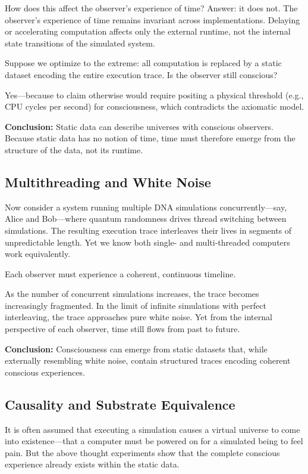 \documentclass[11pt]{article}
\begin{document}
How does this affect the observer's experience of time? Answer: it does not. The observer’s experience of time remains invariant across implementations. Delaying or accelerating computation affects only the external runtime, not the internal state transitions of the simulated system.

Suppose we optimize to the extreme: all computation is replaced by a static dataset encoding the entire execution trace. Is the observer still conscious?

Yes—because to claim otherwise would require positing a physical threshold (e.g., CPU cycles per second) for consciousness, which contradicts the axiomatic model.

\textbf{Conclusion:} Static data can describe universes with conscious observers. Because static data has no notion of time, time must therefore emerge from the structure of the data, not its runtime.

\subsection{Multithreading and White Noise}

Now consider a system running multiple DNA simulations concurrently—say, Alice and Bob—where quantum randomness drives thread switching between simulations. The resulting execution trace interleaves their lives in segments of unpredictable length. Yet we know both single- and multi-threaded computers work equivalently.

Each observer must experience a coherent, continuous timeline.

As the number of concurrent simulations increases, the trace becomes increasingly fragmented. In the limit of infinite simulations with perfect interleaving, the trace approaches pure white noise. Yet from the internal perspective of each observer, time still flows from past to future.

\textbf{Conclusion:} Consciousness can emerge from static datasets that, while externally resembling white noise, contain structured traces encoding coherent conscious experiences.

\subsection{Causality and Substrate Equivalence}

It is often assumed that executing a simulation causes a virtual universe to come into existence—that a computer must be powered on for a simulated being to feel pain. But the above thought experiments show that the complete conscious experience already exists within the static data.
\end{document}

